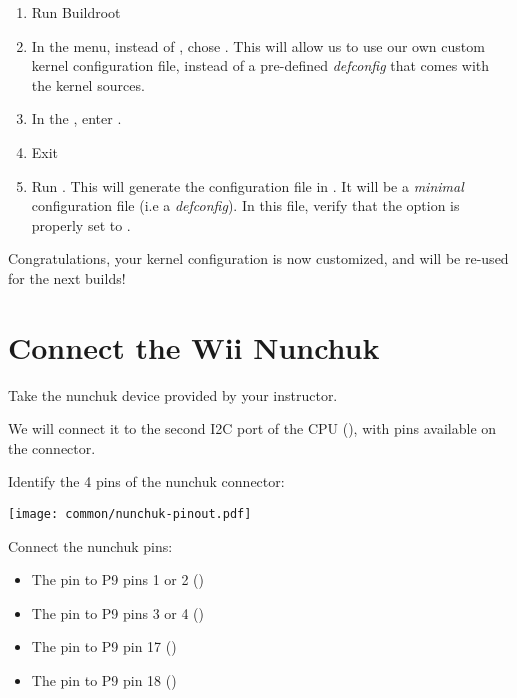 \begin{enumerate}

\item Run Buildroot 

\item In the  menu, instead of ,
  chose . This will allow us to use
  our own custom kernel configuration file, instead of a pre-defined
  {\em defconfig} that comes with the kernel sources.

\item In the , enter
  .

\item Exit 

\item Run . This will generate the
  configuration file in
  . It will be a {\em
    minimal} configuration file (i.e a {\em defconfig}). In this file,
  verify that the option  is properly
  set to .

\end{enumerate}

Congratulations, your kernel configuration is now customized, and will
be re-used for the next builds!

\section{Connect the Wii Nunchuk}

Take the nunchuk device provided by your instructor.

We will connect it to the second I2C port of the CPU (),
with pins available on the  connector.

Identify the 4 pins of the nunchuk connector:

\begin{center}
\texttt{[image: common/nunchuk-pinout.pdf]}
\end{center}

Connect the nunchuk pins:
\begin{itemize}
\item The  pin to P9 pins 1 or 2 ()
\item The  pin to P9 pins 3 or 4 ()
\item The  pin to P9 pin 17 ()
\item The  pin to P9 pin 18 ()
\end{itemize}

